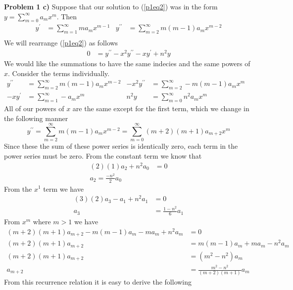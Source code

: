 \documentclass[12pt]{article}
\newcommand{\problem}[1]{\hspace{-4 ex} \large \textbf{Problem #1} }
\begin{document}
\problem{1 c)}
	Suppose that our solution to (\ref{p1eq2}) was in the form $y = \sum \limits _{m=0}^\infty a_m x^m$. Then
	\begin{align*}
		y^\prime & = \sum \limits _{m=1}^\infty ma_{m}x^{m-1} & y^{\prime\prime} & = \sum \limits _{m=2}^\infty m(m-1)a_{m}x^{m-2} \\
	\end{align*}
	We will rearrange (\ref{p1eq2}) as follows
	\begin{align}\label{p1eq2prime}
		0 & = y^{\prime\prime} - x^2y^{\prime\prime}-xy^\prime+n^2y \tag{$2^\prime$}
	\end{align}
	We would like the summations to have the same indecies and the same powers of $x$. Consider the terms individually.
	\begin{align*}
		y^{\prime\prime} & = \sum \limits _{m=2}^\infty m(m-1)a_{m}x^{m-2} & -x^2y^{\prime\prime} & = \sum \limits_{m=2}^\infty -m(m-1)a_m x^m \\
		-xy^\prime & = \sum \limits_{m=1}^\infty -a_m x^m & n^2y & = \sum \limits _{m=0}^\infty n^2 a_m x^m & 
	\end{align*}
	All of our powers of $x$ are the same except for the first term, which we change in the following manner 
	$$y^{\prime\prime} = \sum \limits _{m=2}^\infty m(m-1)a_{m}x^{m-2} = \sum \limits _{m=0}^\infty (m+2)(m+1)a_{m+2}x^{m}$$
	Since these the sum of these power series is identically zero, each term in the power series must be zero. From the constant term we know that
	\begin{align*}
		(2)(1)a_2 + n^2 a_0 & = 0 \\
		a_2 = \tfrac{-n^2}{2}a_0
	\end{align*}
	From the $x^1$ term we have
	\begin{align*}
		(3)(2)a_3 - a_1 + n^2a_1 & = 0 \\
		a_3 & = \tfrac{1-n^2}{6}a_1
	\end{align*}
	From $x^m$ where $m>1$ we have
	\begin{align*}
		(m+2)(m+1)a_{m+2} -m(m-1)a_m - ma_m+n^2 a_m & = 0 \\
		(m+2)(m+1) a_{m+2} & = m(m-1) a_m + m a_m - n^2 a_m \\
		(m+2)(m+1) a_{m+2} & = (m^2 - n^2) a_m \\
		a_{m+2} & = \tfrac{m^2 - n^2}{(m+2)(m+1)}a_m
	\end{align*}
	From this recurrence relation it is easy to derive the following
\end{document}
